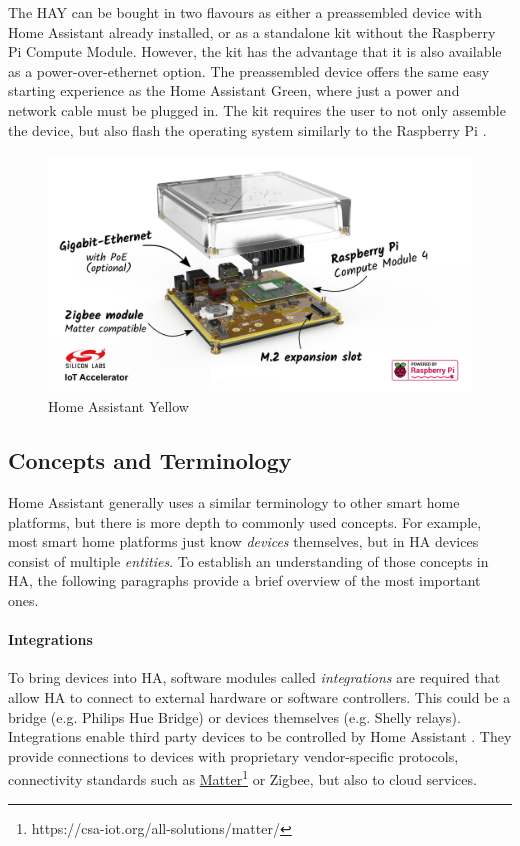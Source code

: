 The HAY can be bought in two flavours as either a preassembled device with Home Assistant already installed, or as a standalone kit without the Raspberry Pi Compute Module. However, the kit has the advantage that it is also available as a power-over-ethernet option. The preassembled device offers the same easy starting experience as the Home Assistant Green, where just a power and network cable must be plugged in. The kit requires the user to not only assemble the device, but also flash the operating system similarly to the Raspberry Pi \cite{HomeAssistant_HAY}.

\begin{figure}[H]
    \centering
    \includegraphics[width=.95\linewidth]{img/ha-yellow-labeled.png}
    \caption{Home Assistant Yellow \cite{HomeAssistant_HAY}}
    \label{fig:HA-Yellow-labeled}
\end{figure}

\subsection{Concepts and Terminology}
Home Assistant generally uses a similar terminology to other smart home platforms, but there is more depth to commonly used concepts. For example, most smart home platforms just know \textit{devices} themselves, but in HA devices consist of multiple \textit{entities}. To establish an understanding of those concepts in HA, the following paragraphs provide a brief overview of the most important ones.

\paragraph{Integrations}
To bring devices into HA, software modules called \textit{integrations} are required that allow HA to connect to external hardware or software controllers. This could be a bridge (e.g. Philips Hue Bridge) or devices themselves (e.g. Shelly relays). Integrations enable third party devices to be controlled by Home Assistant \cite{HomeAssistant_Docs_Concepts}. They provide connections to devices with proprietary vendor-specific protocols, connectivity standards such as \href{https://csa-iot.org/all-solutions/matter/}{Matter}\footnote{https://csa-iot.org/all-solutions/matter/} or Zigbee, but also to cloud services.

